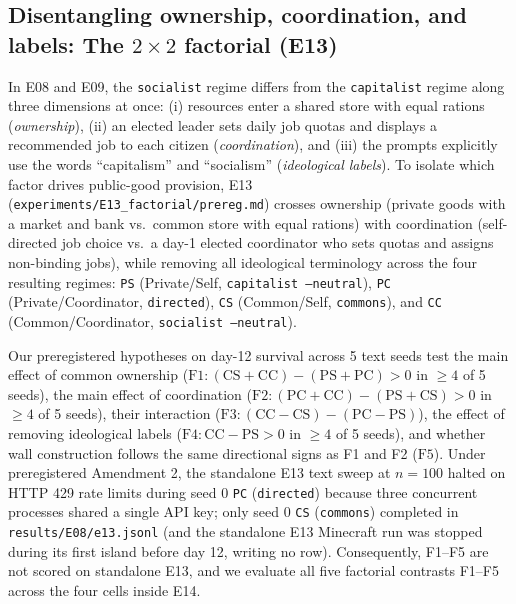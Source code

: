 \documentclass[10pt,letterpaper]{article}
\begin{document}
\subsection{Disentangling ownership, coordination, and labels: The \texorpdfstring{$2 \times 2$}{2x2} factorial (E13)}

In E08 and E09, the \texttt{socialist} regime differs from the \texttt{capitalist} regime along three dimensions at once: (i) resources enter a shared store with equal rations (\emph{ownership}), (ii) an elected leader sets daily job quotas and displays a recommended job to each citizen (\emph{coordination}), and (iii) the prompts explicitly use the words ``capitalism'' and ``socialism'' (\emph{ideological labels}). To isolate which factor drives public-good provision, E13 (\texttt{experiments/E13\_factorial/prereg.md}) crosses ownership (private goods with a market and bank vs.\ common store with equal rations) with coordination (self-directed job choice vs.\ a day-1 elected coordinator who sets quotas and assigns non-binding jobs), while removing all ideological terminology across the four resulting regimes: \texttt{PS} (Private/Self, \texttt{capitalist --neutral}), \texttt{PC} (Private/Coordinator, \texttt{directed}), \texttt{CS} (Common/Self, \texttt{commons}), and \texttt{CC} (Common/Coordinator, \texttt{socialist --neutral}).

Our preregistered hypotheses on day-12 survival across 5 text seeds test the main effect of common ownership ($\text{F1}: (\text{CS} + \text{CC}) - (\text{PS} + \text{PC}) > 0$ in $\ge 4$ of 5 seeds), the main effect of coordination ($\text{F2}: (\text{PC} + \text{CC}) - (\text{PS} + \text{CS}) > 0$ in $\ge 4$ of 5 seeds), their interaction ($\text{F3}: (\text{CC} - \text{CS}) - (\text{PC} - \text{PS})$), the effect of removing ideological labels ($\text{F4}: \text{CC} - \text{PS} > 0$ in $\ge 4$ of 5 seeds), and whether wall construction follows the same directional signs as F1 and F2 ($\text{F5}$). Under preregistered Amendment 2, the standalone E13 text sweep at $n = 100$ halted on HTTP 429 rate limits during seed 0 \texttt{PC} (\texttt{directed}) because three concurrent processes shared a single API key; only seed 0 \texttt{CS} (\texttt{commons}) completed in \texttt{results/E08/e13.jsonl} (and the standalone E13 Minecraft run was stopped during its first island before day 12, writing no row). Consequently, F1--F5 are not scored on standalone E13, and we evaluate all five factorial contrasts F1--F5 across the four cells inside E14.
\end{document}
